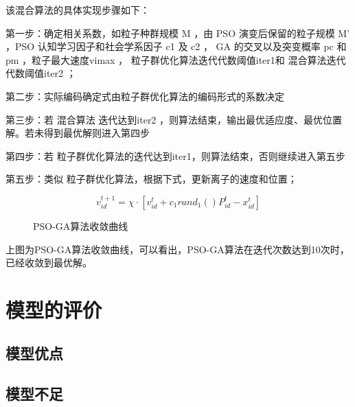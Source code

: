 \documentclass[withoutpreface,bwprint]{cumcmthesis} %
\begin{document}
该混合算法的具体实现步骤如下：

第一步：确定相关系数，如粒子种群规模 M ，由 PSO 演变后保留的粒子规模 M' ，PSO 认知学习因子和社会学系因子 c1 及 c2 ， GA 的交叉以及突变概率 pc 和 pm ，粒子最大速度vimax ， 粒子群优化算法迭代代数阈值iter1和 混合算法迭代代数阈值iter2 ；

第二步：实际编码确定式由粒子群优化算法的编码形式的系数决定

第三步：若 混合算法 迭代达到iter2 ，则算法结束，输出最优适应度、最优位置解。若未得到最优解则进入第四步

第四步：若 粒子群优化算法的迭代达到iter1，则算法结束，否则继续进入第五步

第五步：类似 粒子群优化算法，根据下式，更新离子的速度和位置；

$$v^{t+1}_{id}=\chi\cdot[v^{t}_{id}+c_{1}rand_{1}()P^{t}_{id}-x^{t}_{id}]$$

\begin{figure}
    \centering
    \caption{PSO-GA算法收敛曲线}
\end{figure}

上图为PSO-GA算法收敛曲线，可以看出，PSO-GA算法在迭代次数达到10次时，已经收敛到最优解。


\section{模型的评价}

\subsection{模型优点}

\subsection{模型不足}





\end{document}
